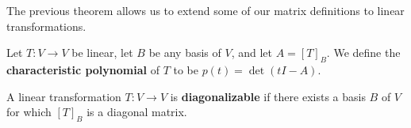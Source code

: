 %
%
%
%
%
\begin{frame}
\footnotesize
The previous theorem allows us to extend some of our matrix definitions to linear transformations. 
\begin{definition}
Let $T\colon V\rightarrow V$ be linear, let $B$ be \alert{any basis} of $V$, and let $A=[T]_B$. We  define
the {\bf characteristic polynomial} of $T$ to be $p(t)=\det(tI-A)$. 
\end{definition}
\pause

\pause
\begin{definition}
A linear transformation $T\colon V\rightarrow V$ is {\bf diagonalizable} if there exists a basis $B$ of $V$ for which $[T]_B$ is a diagonal matrix. 
\end{definition}
 \pause

 \end{frame}

